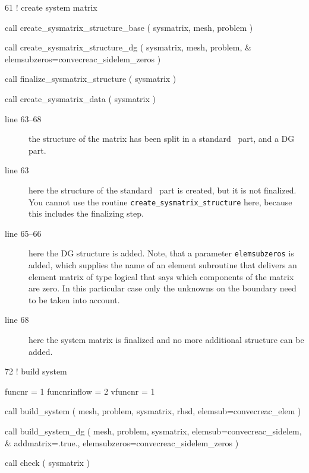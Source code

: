 \begin{listing}{61}
! create system matrix
                                                                                
  call create_sysmatrix_structure_base ( sysmatrix, mesh, problem )
                                                                                
  call create_sysmatrix_structure_dg ( sysmatrix, mesh, problem, &
    elemsubzeros=convecreac_sidelem_zeros )
                                                                                
  call finalize_sysmatrix_structure ( sysmatrix )
                                                                                
  call create_sysmatrix_data ( sysmatrix )
                                                                                
\end{listing}
\begin{description}
   \item[line 63--68] the structure of the matrix has been split in a standard
      \fem\ part, and a DG part.
   \item[line 63] here the structure of the standard \fem\ part is created, but
      it is not finalized. You cannot use the routine
    \texttt{create\_sysmatrix\_structure} here, because this includes the
     finalizing step.
   \item[line 65--66] here the DG structure is added. Note, that a parameter
    \texttt{elemsubzeros} is added, which supplies the name of an element
     subroutine that delivers an element matrix of type logical that says which
     components of the matrix are zero. In this particular
     case only the unknowns on the
     boundary need to be taken into account.
   \item[line 68] here the system matrix is finalized and no more additional
     structure can be added.
\end{description}

\begin{listing}{72}
! build system
                                                                                
  funcnr = 1
  funcnrinflow = 2
  vfuncnr = 1
                                                                                
  call build_system ( mesh, problem, sysmatrix, rhsd, elemsub=convecreac_elem )
                                                                                
  call build_system_dg ( mesh, problem, sysmatrix, elemsub=convecreac_sidelem,
&    addmatrix=.true., elemsubzeros=convecreac_sidelem_zeros )
                                                                                
  call check ( sysmatrix )
                                                                                
\end{listing}


